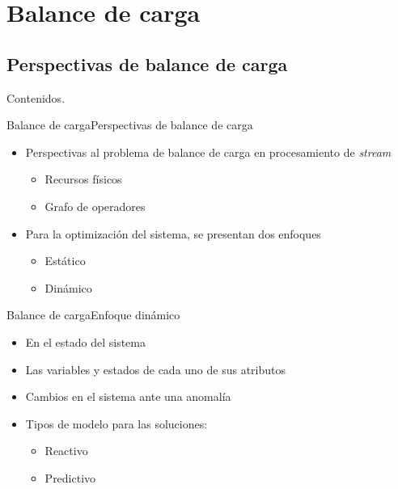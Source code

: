 \section{Balance de carga}
\subsection*{Perspectivas de balance de carga}

\addtocounter{framenumber}{-1}
\begin{frame}[t]{Contenidos}{\textcolor{UniBlue}{.}}
	\tableofcontents[currentsection]
\end{frame}

\begin{frame}{Balance de carga}{Perspectivas de balance de carga}
\begin{itemize}
\item Perspectivas al problema de balance de carga en procesamiento de \textsl{stream}
\begin{itemize}
	\item Recursos físicos
	\item Grafo de operadores
\end{itemize}
\item Para la optimización del sistema, se presentan dos enfoques \cite{Dong06schedulingalgorithms}
\begin{itemize}
	\item Estático
	\item Dinámico
\end{itemize}
\end{itemize}
\end{frame}

\begin{frame}{Balance de carga}{Enfoque dinámico}
\begin{itemize}
\item En el estado del sistema
\item Las variables y estados de cada uno de sus atributos
\item Cambios en el sistema ante una anomalía
\item Tipos de modelo para las soluciones:
\begin{itemize}
	\item Reactivo \cite{GulisanoJPSV12}
	\item Predictivo \cite{NguyenSGSW13}
\end{itemize}
\end{itemize}
\end{frame}

